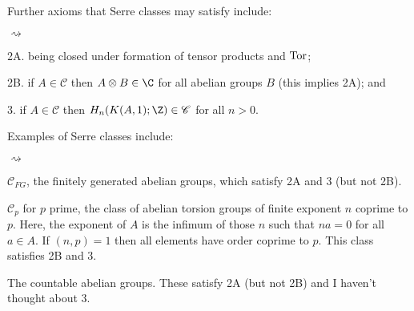 \documentclass[11pt]{article}
\newcommand{\Tor}{\textup{Tor}}
\theoremstyle{plain}
\theoremstyle{definition}
\newcommand{\SerreClass}{\mathscr{C}}
\newenvironment{itemise}{
\begin{list}{\textup{$\rightsquigarrow$}}
   {
      \setlength{\topsep}{.1cm}
      \setlength{\itemsep}{1pt}
      \setlength{\parskip}{0pt}
      \setlength{\parsep}{0pt}
   }
}{\end{list}\vspace{-.2cm}}
\begin{document}
Further axioms that Serre classes may satisfy include:
\begin{itemise}
\item[2A.] being closed under formation of tensor products and $\Tor$;
\item[2B.] if  $A\in\SerreClass$ then $A\otimes B\in\C$ for all abelian groups $B$ (this implies 2A); and
\item[3.] if $A\in\SerreClass$ then $H_n(K(A,1);\Z)\in\SerreClass$ for all $n>0$.
\end{itemise}
Examples of Serre classes include:
\begin{itemise}
\item $\SerreClass_{FG}$, the finitely generated abelian groups, which satisfy 2A and 3 (but not 2B).
\item $\SerreClass_{p}$ for $p$ prime, the class of abelian torsion groups of finite exponent $n$ coprime to $p$. Here, the exponent of $A$ is the infimum of those $n$ such that $na=0$ for all $a\in A$. If $(n,p)=1$ then all elements have order coprime to $p$. This class satisfies 2B and 3.
\item The countable abelian groups. These satisfy 2A (but not 2B) and I haven't thought about 3.
\end{itemise}
\setcounter{subsection}{1}
\end{document}
